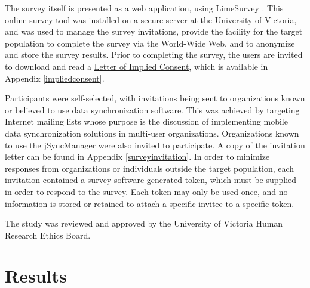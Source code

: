 The survey itself is presented as a web application, using LimeSurvey \cite{limesurvey}.  This online survey tool was installed on a secure server at the University of Victoria, and was used to manage the survey invitations, provide the facility for the target population to complete the survey via the World-Wide Web, and to anonymize and store the survey results.  Prior to completing the survey, the users are invited to download and read a \underline{Letter of Implied Consent}, which is available in Appendix \ref{impliedconsent}.

Participants were self-selected, with invitations being sent to organizations known or believed to use data synchronization software.  This was achieved by targeting Internet mailing lists whose purpose is the discussion of implementing mobile data synchronization solutions in multi-user organizations.  Organizations known to use the jSyncManager \cite{RefWorks:30} were also invited to participate.  A copy of the invitation letter can be found in Appendix \ref{surveyinvitation}.  In order to minimize responses from organizations or individuals outside the target population, each invitation contained a survey-software generated token, which must be supplied in order to respond to the survey.  Each token may only be used once, and no information is stored or retained to attach a specific invitee to a specific token.

The study was reviewed and approved by the University of Victoria Human Research Ethics Board.

\section{Results}

